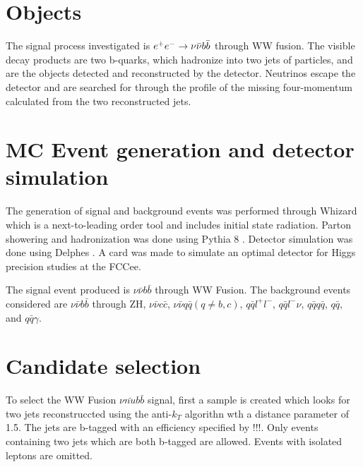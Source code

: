 \documentclass[preprintnumbers,nofootinbib,noshowpacs,eqsecnum,prd,superscriptaddress,letterpaper]{revtex4}
\begin{document}
\section{Objects}
\label{sec:samples}

The signal process investigated is $e^+e^-\rightarrow\nu\bar{\nu} b\bar{b}$ through WW fusion. The visible decay products are two b-quarks, which hadronize into two jets of particles, and are the objects detected and reconstructed by the detector. Neutrinos escape the detector and are searched for through the profile of the missing four-momentum calculated from the two reconstructed jets.


\section{MC Event generation and detector simulation}
\label{sec:samples}

The generation of signal and background events was performed through Whizard \cite{whizard} which is a next-to-leading order tool and includes initial state radiation. Parton showering and hadronization was done using Pythia 8 \cite{pythia}. Detector simulation was done using Delphes \cite{delphes}. A card was made to simulate an optimal detector for Higgs precision studies at the FCCee. 

The signal event produced is $\nu\bar{\nu}b\bar{b}$ through WW Fusion. The background events considered are $\nu\bar{\nu}b\bar{b}$ through ZH, $\nu\bar{\nu}c\bar{c}$, $\nu\bar{\nu}q\bar{q} (q\neq b,c)$, $q\bar{q}l^+l^-$, $q\bar{q}l^-\nu$, $q\bar{q}q\bar{q}$, $q\bar{q}$, and $q\bar{q}\gamma$.  

\section{Candidate selection}
\label{sec:selection}

To select the WW Fusion $\nu\bar{nu}b\bar{b}$ signal, first a sample is created which looks for two jets reconstruccted using the anti-$k_T$ algorithn wth a distance parameter of 1.5. The jets are b-tagged with an efficiency specified by !!!. Only events containing two jets which are both b-tagged are allowed. Events with isolated leptons are omitted. 
\end{document}

